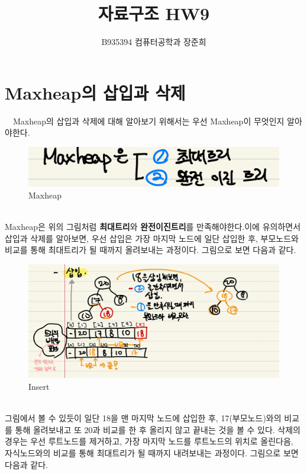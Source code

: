 \documentclass[a4paper,11pt]{article}
\begin{document}
\title{자료구조 HW9}
\author{B935394 컴퓨터공학과 장준희}
\maketitle
\newpage
\section{Maxheap의 삽입과 삭제}
\ \ Maxheap의 삽입과 삭제에 대해 알아보기 위해서는 우선 Maxheap이 무엇인지 알아야한다.\\
\begin{figure}[h]
\begin{center}
\includegraphics[width=\textwidth]{maxheap}
\caption{Maxheap}
\label{fig:fig1}
\end{center}
\end{figure}
\\Maxheap은 위의 그림처럼 \textbf{최대트리}와 \textbf{완전이진트리}를 만족해야한다.이에 유의하면서 삽입과 삭제를 알아보면,
우선 삽입은 가장 마지막 노드에 일단 삽입한 후, 부모노드와 비교를 통해 최대트리가 될 때까지 올려보내는 과정이다. 그림으로 보면 다음과 같다.
\begin{figure}[h]
\begin{center}
\includegraphics[width=\textwidth]{insert}
\caption{Insert}
\label{fig:fig2}
\end{center}
\end{figure}
\\그림에서 볼 수 있듯이 일단 18을 맨 마지막 노드에 삽입한 후, 17(부모노드)와의 비교를 통해 올려보내고 또 20과 비교를 한 후 올리지 않고 끝내는 것을 볼 수 있다.
\newpage 삭제의 경우는 우선 루트노드를 제거하고, 가장 마지막 노드를 루트노드의 위치로 올린다음, 자식노드와의 비교를 통해 최대트리가 될 때까지 내려보내는 과정이다. 그림으로 보면 다음과 같다.
\end{document}
